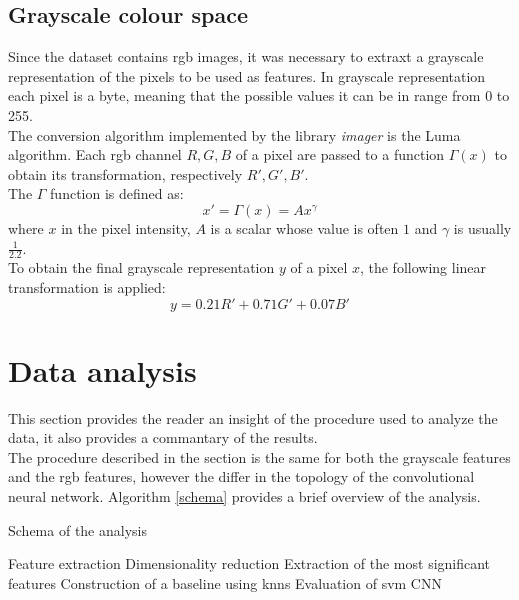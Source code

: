 \documentclass{article}
\begin{document}
\subsection{Grayscale colour space}
Since the dataset contains rgb images, it was necessary to extraxt a grayscale representation of the pixels to be used as features.
In grayscale representation each pixel is a byte, meaning that the possible values it can be in range from 0 to 255. \\
The conversion algorithm implemented by the library \textit{imager} is the Luma algorithm. Each rgb channel $R, G, B$ of a pixel are passed to a function $\Gamma(x)$ to obtain its transformation, respectively $R', G', B'$. \\
The $\Gamma$ function is defined as: 
\begin{equation}
 x' = \Gamma(x) = Ax^{\gamma}
\end{equation}
where $x$ in the pixel intensity, $A$ is a scalar whose value is often $1$ and $\gamma$ is usually $\frac{1}{2.2}$.\\
To obtain the final grayscale representation  $y$ of a pixel $x$, the following linear transformation is applied: \cite{grayscaleconversion}
\begin{equation}
 y = 0.21 R' + 0.71 G' + 0.07  B'
\end{equation}


\section{Data analysis}
This section provides the reader an insight of the procedure used to analyze the data, it also provides a commantary of the results.\\
The procedure described in the section is the same for both the grayscale features and the rgb features, however the differ in the topology of the convolutional neural network. Algorithm \ref{schema} provides a brief overview of the analysis.

\begin{algorithm}[H] 
   \caption{Schema of the analysis} \label{schema}
    \begin{algorithmic}[1]
    \State Feature extraction
    \State Dimensionality reduction
    \State Extraction of the most significant features
    \State Construction of a baseline using knns
    \State Evaluation of svm
    \State CNN
\end{algorithmic}
\end{algorithm}
\end{document}
